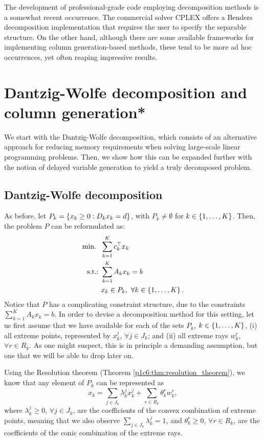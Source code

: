 The development of professional-grade code employing decomposition methods is a somewhat recent occurrence. The commercial solver CPLEX offers a Benders decomposition implementation that requires the user to specify the separable structure. On the other hand, although there are some available frameworks for implementing column generation-based methods, these tend to be more ad hoc occurrences, yet often reaping impressive results.  


\section{Dantzig-Wolfe decomposition and column generation*} \label{section_72}

We start with the Dantzig-Wolfe decomposition, which consists of an alternative approach for reducing memory requirements when solving large-scale linear programming problems. Then, we show how this can be expanded further with the notion of delayed variable generation to yield a truly decomposed problem.


\subsection{Dantzig-Wolfe decomposition}

As before, let $P_k = \left\{ x_k \geq 0 : D_kx_k = d \right \}$, with $P_k \neq \emptyset$ for $k \in \left\{ 1,\dots,K \right \}$. Then, the problem $P$ can be reformulated as:
%
\begin{align*}
	\mathop{\text{min.~}} \ & \sum_{k = 1}^K c_k ^\top x_k 	\\
	\mathop{\text{s.t.:~}} & \sum_{k=1}^K A_k x_k = b \\
	& x_k \in P_k, \ \forall k \in \left\{ 1,\dots,K \right \}. 
\end{align*}
%
Notice that $P$ has a complicating constraint structure, due to the constraints $\sum_{k=1}^K A_k x_k = b$. In order to devise a decomposition method for this setting, let us first assume that we have available for each of the sets $P_k$, $k \in \left\{ 1,\dots,K \right \}$, (i) all extreme points, represented by $x_k^j$, $\forall j \in J_k$; and (ii) all extreme rays $w_k^r$, $\forall r \in R_k$. As one might suspect, this is in principle a demanding assumption, but one that we will be able to drop later on.

Using the Resolution theorem (Theorem \ref{p1c6:thm:resolution_theorem}), we know that any element of $P_k$ can be represented as 
%
\begin{equation} \label{p1c7:eq:resolution_representation}
	x_k = \sum_{j \in J_k} \lambda_k^j x_k^j + \sum_{r \in R_k} \theta_k^r w_k^r, 	
\end{equation}
%
where $\lambda_k^j \geq 0$, $\forall j \in J_k$, are the coefficients of the convex combination of extreme points, meaning that we also observe $\sum_{j \in J_k} \lambda_k^j = 1$, and $\theta_k^r \geq 0$, $\forall r \in R_k$, are the coefficients of the conic combination of the extreme rays.

